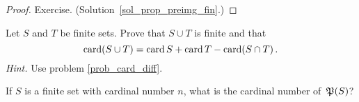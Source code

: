 \begin{proof}  Exercise.  (Solution~\ref{sol_prop_preimg_fin}.)  \ns  \end{proof}

\begin{prob}\label{prob_union_fin} Let $S$ and $T$ be finite sets.  Prove that $S \cup T$ is
finite and that
  \[ \operatorname{card} (S \cup T)  = \operatorname{card} S + \operatorname{card} T - \operatorname{card} (S \cap T)\,. \]
\emph{Hint.}  Use problem \ref{prob_card_diff}.
\end{prob}

\begin{prob}  If $S$ is a finite set with cardinal number $n$, what is the cardinal number
of~$\mathfrak{P}(S)$?
\end{prob}



\endinput
